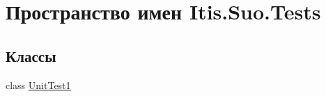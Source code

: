 \hypertarget{namespace_itis_1_1_suo_1_1_tests}{}\section{Пространство имен Itis.\+Suo.\+Tests}
\label{namespace_itis_1_1_suo_1_1_tests}
\subsection*{Классы}
\begin{DoxyCompactItemize}
\item 
class \hyperlink{class_itis_1_1_suo_1_1_tests_1_1_unit_test1}{Unit\+Test1}
\end{DoxyCompactItemize}
